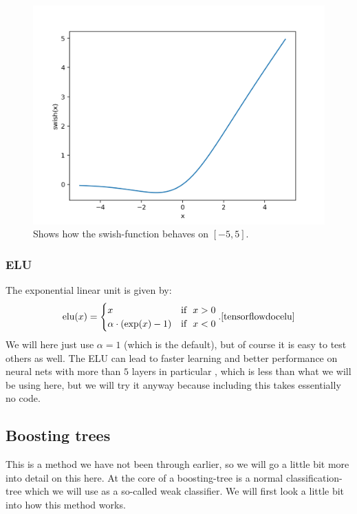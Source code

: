 \documentclass{article}
\begin{document}
\begin{figure}
	\centering
	\includegraphics[scale=0.8]{swish_plot}
	\caption{Shows how the swish-function behaves on $[-5, 5]$.}
	\label{swishillustration}
\end{figure}

\subsubsection{ELU}
The exponential linear unit is given by:
\[
	\text{elu}(x) = \begin{cases} x \qquad \qquad & \text{if}\ \ x > 0 \\ \alpha \cdot (\exp(x) - 1) & \text{if}\ \ x < 0 \end{cases}. \cite{tensorflowdocelu}
\]
We will here just use $\alpha = 1$ (which is the default), but of course it is
easy to test others as well. The ELU can lead to faster learning and better
performance on neural nets with more than $5$ layers in particular
\cite{clevert2016fast}, which is less than what we will be using here,
but we will try it anyway because including this takes essentially no code.

\subsection{Boosting trees}
This is a method we have not been through earlier, so we will go a little bit
more into detail on this here. At the core of a boosting-tree is a normal
classification-tree which we will use as a so-called weak classifier. We will
first look a little bit into how this method works.
\end{document}
